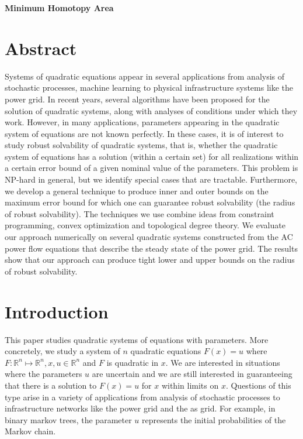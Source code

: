 \documentclass[11pt]{article}
\theoremstyle{plain}
\theoremstyle{definition}
\theoremstyle{remark}
\begin{document}
\begin{center}
\textbf{Minimum Homotopy Area}
\end{center}



\section*{Abstract}
Systems of quadratic equations appear in several applications from analysis of stochastic processes, machine learning to physical infrastructure systems like the power grid. In recent years, several algorithms have been proposed for the solution of quadratic systems, along with analyses of conditions under which they work. However, in many applications, parameters appearing in the quadratic system of equations are not known perfectly. In these cases, it is of interest to study robust solvability of quadratic systems, that is, whether the quadratic system of equations has a solution (within a certain set) for all realizations within a certain error bound of a given nominal value of the parameters. This problem is NP-hard in general, but we identify special cases that are tractable. Furthermore, we develop a general technique to produce inner and outer bounds on the maximum error bound for which one can guarantee robust solvability (the radius of robust solvability).
The techniques we use combine ideas from constraint programming, convex optimization and topological degree theory. We evaluate our approach numerically on several quadratic systems constructed from the AC power flow equations that describe the steady state of the power grid. The results show that our approach can produce tight lower and upper bounds on the radius of robust solvability.


\section{Introduction}
This paper studies quadratic systems of equations with parameters. More concretely, we study a system of $n$ quadratic equations $F(x)=u$ where $F: \mathbb{R}^n \mapsto \mathbb{R}^n, x,u \in \mathbb{R}^n$ and $F$ is quadratic in $x$. We are interested in situations where the parameters $u$ are uncertain and we are still interested in guaranteeing that there is a solution to $F(x) = u$ for $x$ within limits on $x$. Questions of this type arise in a variety of applications from analysis of stochastic processes to infrastructure networks like the power grid and the as grid. For example, in binary markov trees, the parameter $u$ represents the initial probabilities of the Markov chain.
\end{document}

